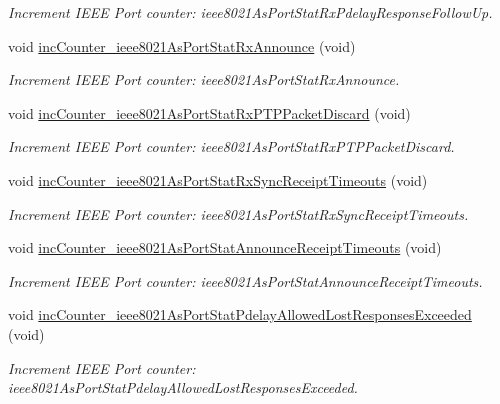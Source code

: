 \begin{DoxyCompactItemize}
\begin{DoxyCompactList}\small\item\em Increment I\+E\+EE Port counter\+: ieee8021\+As\+Port\+Stat\+Rx\+Pdelay\+Response\+Follow\+Up. \end{DoxyCompactList}\item 
void \hyperlink{class_common_port_ad2bd29a405395048ac98c1ad5f3b4d0f}{inc\+Counter\+\_\+ieee8021\+As\+Port\+Stat\+Rx\+Announce} (void)
\begin{DoxyCompactList}\small\item\em Increment I\+E\+EE Port counter\+: ieee8021\+As\+Port\+Stat\+Rx\+Announce. \end{DoxyCompactList}\item 
void \hyperlink{class_common_port_ab127287dc3c8d4bed5595b456ba4b17d}{inc\+Counter\+\_\+ieee8021\+As\+Port\+Stat\+Rx\+P\+T\+P\+Packet\+Discard} (void)
\begin{DoxyCompactList}\small\item\em Increment I\+E\+EE Port counter\+: ieee8021\+As\+Port\+Stat\+Rx\+P\+T\+P\+Packet\+Discard. \end{DoxyCompactList}\item 
void \hyperlink{class_common_port_adf1a589504e919c03125807f4d10e9e2}{inc\+Counter\+\_\+ieee8021\+As\+Port\+Stat\+Rx\+Sync\+Receipt\+Timeouts} (void)
\begin{DoxyCompactList}\small\item\em Increment I\+E\+EE Port counter\+: ieee8021\+As\+Port\+Stat\+Rx\+Sync\+Receipt\+Timeouts. \end{DoxyCompactList}\item 
void \hyperlink{class_common_port_a05a0d76025b1ab762b3f27232d0090a5}{inc\+Counter\+\_\+ieee8021\+As\+Port\+Stat\+Announce\+Receipt\+Timeouts} (void)
\begin{DoxyCompactList}\small\item\em Increment I\+E\+EE Port counter\+: ieee8021\+As\+Port\+Stat\+Announce\+Receipt\+Timeouts. \end{DoxyCompactList}\item 
void \hyperlink{class_common_port_ae73fbbb4e445d29d617bf929edf5e708}{inc\+Counter\+\_\+ieee8021\+As\+Port\+Stat\+Pdelay\+Allowed\+Lost\+Responses\+Exceeded} (void)
\begin{DoxyCompactList}\small\item\em Increment I\+E\+EE Port counter\+: ieee8021\+As\+Port\+Stat\+Pdelay\+Allowed\+Lost\+Responses\+Exceeded. \end{DoxyCompactList}\item 

\end{DoxyCompactItemize}
